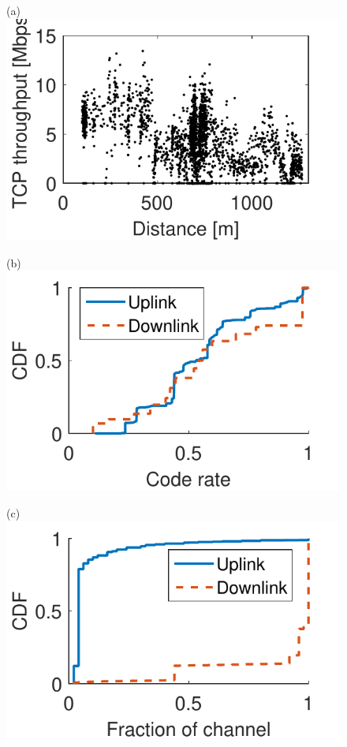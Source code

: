 \begin{figure}[t]
  \begin{minipage}{0.32\textwidth}
    \centering
    (a)
    \vskip -2pt
    \includegraphics[width=\textwidth]{./figs/range.pdf}
  \end{minipage}
  \begin{minipage}{0.32\textwidth}
    \centering
    (b)
    \vskip -2pt
    \includegraphics[width=\textwidth]{./figs/coding_rate.pdf}
  \end{minipage}
  \begin{minipage}{0.32\textwidth}
    \centering
    (c)
    \vskip -2pt
    \includegraphics[width=\textwidth]{./figs/NRB.pdf}

\end{minipage}
\end{figure}
